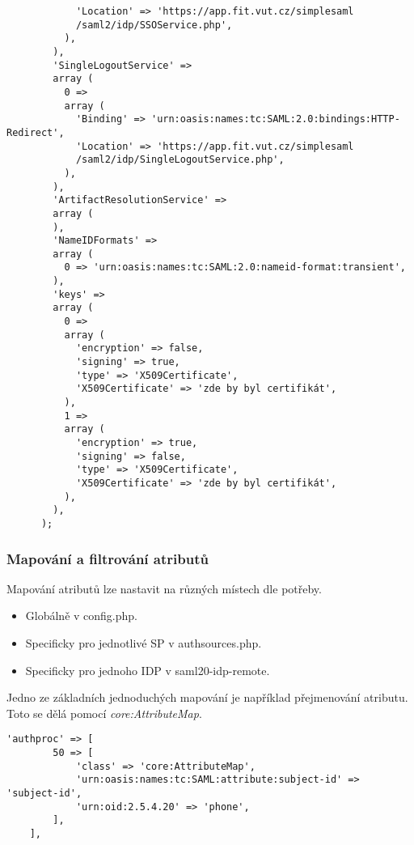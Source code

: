 \begin{lstlisting}
            'Location' => 'https://app.fit.vut.cz/simplesaml
            /saml2/idp/SSOService.php',
          ),
        ),
        'SingleLogoutService' =>
        array (
          0 =>
          array (
            'Binding' => 'urn:oasis:names:tc:SAML:2.0:bindings:HTTP-Redirect',
            'Location' => 'https://app.fit.vut.cz/simplesaml
            /saml2/idp/SingleLogoutService.php',
          ),
        ),
        'ArtifactResolutionService' =>
        array (
        ),
        'NameIDFormats' =>
        array (
          0 => 'urn:oasis:names:tc:SAML:2.0:nameid-format:transient',
        ),
        'keys' =>
        array (
          0 =>
          array (
            'encryption' => false,
            'signing' => true,
            'type' => 'X509Certificate',
            'X509Certificate' => 'zde by byl certifikát',
          ),
          1 =>
          array (
            'encryption' => true,
            'signing' => false,
            'type' => 'X509Certificate',
            'X509Certificate' => 'zde by byl certifikát',
          ),
        ),
      );

\end{lstlisting}

\subsubsection{Mapování a filtrování atributů}\label{attributemap_ssphp} %
Mapování atributů lze nastavit na různých místech dle potřeby.

\begin{itemize}

    \item Globálně v config.php.
    \item Specificky pro jednotlivé SP v authsources.php.
    \item Specificky pro jednoho IDP v saml20-idp-remote.

\end{itemize}

Jedno ze základních jednoduchých mapování je například přejmenování atributu. Toto se dělá pomocí \emph{core:AttributeMap}.

\begin{lstlisting}[json]
    'authproc' => [
        50 => [
            'class' => 'core:AttributeMap',
            'urn:oasis:names:tc:SAML:attribute:subject-id' => 'subject-id',
            'urn:oid:2.5.4.20' => 'phone',
        ],
    ],
\end{lstlisting}

